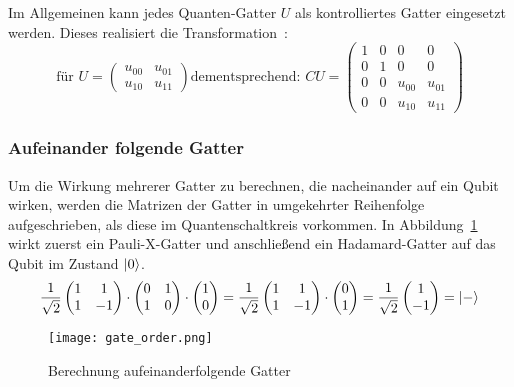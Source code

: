 Im Allgemeinen kann jedes Quanten-Gatter \(U\) als kontrolliertes Gatter eingesetzt werden. 
Dieses realisiert die Transformation~\cite{Hoever2023QC}: 
\[
  \text{für }
  U = 
  \begin{pmatrix}
    u_{00} & u_{01}\\
    u_{10} & u_{11}
    \end{pmatrix}
    \text{dementsprechend: }
    CU = 
  \begin{pmatrix}
    1 & 0 & 0 & 0\\
    0 & 1 & 0 & 0\\
    0 & 0 & u_{00} & u_{01}\\
    0 & 0 & u_{10} & u_{11}
    \end{pmatrix}
  \]

  \vspace{1em}

\subsubsection*{Aufeinander folgende Gatter} 

Um die Wirkung mehrerer Gatter zu berechnen, die nacheinander auf ein Qubit wirken, 
werden die Matrizen der Gatter in umgekehrter Reihenfolge aufgeschrieben, 
als diese im Quantenschaltkreis vorkommen. 
In Abbildung~\ref{fig:gate_order} wirkt zuerst ein Pauli-X-Gatter und anschließend ein Hadamard-Gatter auf das Qubit im Zustand \(\ket{0}\).
\[
  \frac{1}{\sqrt{2}}
  \begin{pmatrix}
    1 & 1 \\
    1 & -1
    \end{pmatrix} 
    \cdot
    \begin{pmatrix}
      0 & 1 \\
      1 & 0
      \end{pmatrix} 
    \cdot
    \begin{pmatrix}
      1  \\
      0 
      \end{pmatrix} 
      =
      \frac{1}{\sqrt{2}}
      \begin{pmatrix}
        1 & 1 \\
        1 & -1
        \end{pmatrix} 
      \cdot
      \begin{pmatrix}
        0  \\
        1 
        \end{pmatrix} 
        =
        \frac{1}{\sqrt{2}}
        \begin{pmatrix}
          1  \\
          -1 
          \end{pmatrix}
        =
        \ket{-}
  \]
\begin{figure}[H]
  \centering
  \texttt{[image: gate\_order.png]}
  \caption{Berechnung aufeinanderfolgende Gatter}
  \label{fig:gate_order}
\end{figure}

